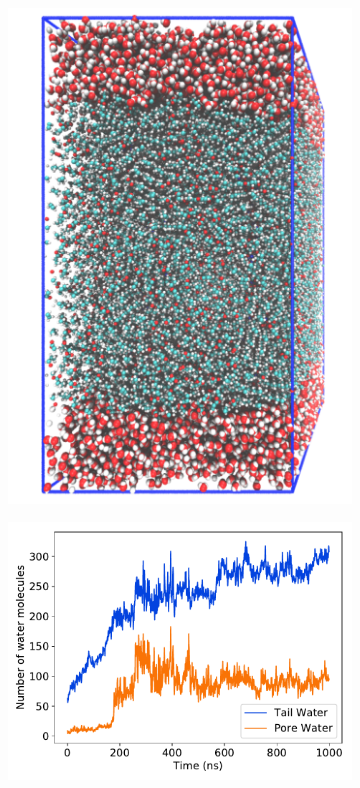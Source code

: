 \documentclass{article}
\begin{document}
  \begin{figure}[!htb]
  \centering
  \begin{subfigure}{0.18\textwidth}
  \includegraphics[width=\linewidth]{gap.pdf}
  \caption{}\label{fig:gap}
  \end{subfigure}  
  \begin{subfigure}{0.37\textwidth}
  \includegraphics[width=\linewidth]{equilibrated_water_penetration.pdf}

\end{subfigure}
\end{figure}
\end{document}
